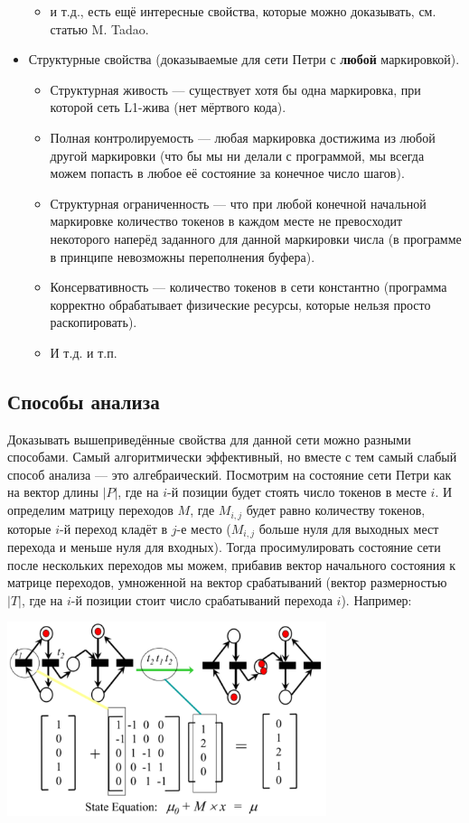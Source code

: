 \documentclass{../mcstext}
\begin{document}
\begin{itemize}
\begin{itemize}
        \item и т.д., есть ещё интересные свойства, которые можно доказывать, см. статью M. Tadao.
    \end{itemize}
    \item Структурные свойства (доказываемые для сети Петри с \textbf{любой} маркировкой).
    \begin{itemize}
        \item Структурная живость --- существует хотя бы одна маркировка, при которой сеть L1-жива (нет мёртвого кода).
        \item Полная контролируемость --- любая маркировка достижима из любой другой маркировки (что бы мы ни делали с программой, мы всегда можем попасть в любое её состояние за конечное число шагов).
        \item Структурная ограниченность --- что при любой конечной начальной маркировке количество токенов в каждом месте не превосходит некоторого наперёд заданного для данной маркировки числа (в программе в принципе невозможны переполнения буфера).
        \item Консервативность --- количество токенов в сети константно (программа корректно обрабатывает физические ресурсы, которые нельзя просто раскопировать).
        \item И т.д. и т.п.
    \end{itemize}
\end{itemize}

\subsection{Способы анализа}

Доказывать вышеприведённые свойства для данной сети можно разными способами. Самый алгоритмически эффективный, но вместе с тем самый слабый способ анализа --- это алгебраический. Посмотрим на состояние сети Петри как на вектор длины $|P|$, где на $i$-й позиции будет стоять число токенов в месте $i$. И определим матрицу переходов $M$, где $M_{i, j}$ будет равно количеству токенов, которые $i$-й переход кладёт в $j$-е место ($M_{i, j}$ больше нуля для выходных мест перехода и меньше нуля для входных). Тогда просимулировать состояние сети после нескольких переходов мы можем, прибавив вектор начального состояния к матрице переходов, умноженной на вектор срабатываний (вектор размерностью $|T|$, где на $i$-й позиции стоит число срабатываний перехода $i$). Например:

\begin{center}
    \includegraphics[width=0.7\textwidth]{petriAlgebraicAnalysis.png}
\end{center}
\end{document}
